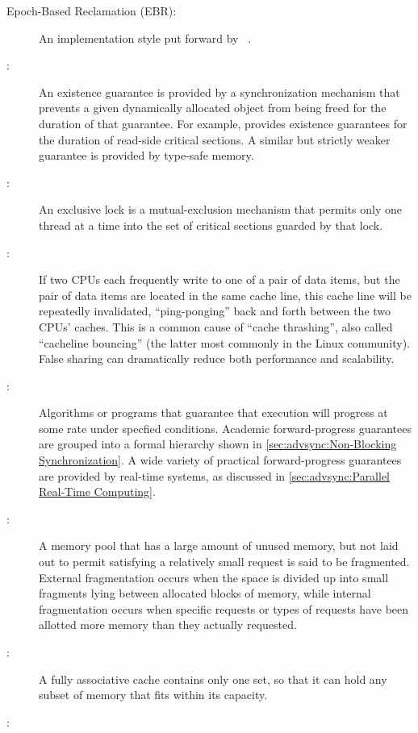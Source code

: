 \begin{description}
\item[Epoch-Based Reclamation (EBR):]
	An  implementation style put forward by
	~\cite{KeirAnthonyFraserPhD,UCAM-CL-TR-579,KeirFraser2007withoutLocks}.
\item[:]
	An existence guarantee is provided by a synchronization mechanism
	that prevents a given dynamically allocated object from being
	freed for the duration of that guarantee.
	For example,  provides existence guarantees for the duration
	of  read-side critical sections.
	A similar but strictly weaker guarantee is provided by
	type-safe memory.
\item[:]
	An exclusive lock is a mutual-exclusion mechanism that
	permits only one thread at a time into the
	set of critical sections guarded by that lock.
\item[:]
	If two CPUs each frequently write to one of a pair of data items,
	but the pair of data items are located in the same cache line,
	this cache line will be repeatedly invalidated, ``ping-ponging''
	back and forth between the two CPUs' caches.
	This is a common cause of ``cache thrashing'', also called
	``cacheline bouncing'' (the latter most commonly in the Linux
	community).
	False sharing can dramatically reduce both performance and
	scalability.
\item[:]
	Algorithms or programs that guarantee that execution will
	progress at some rate under specfied conditions.
	Academic forward-progress guarantees are grouped into a
	formal hierarchy shown in
	\cref{sec:advsync:Non-Blocking Synchronization}.
	A wide variety of practical forward-progress guarantees are
	provided by real-time systems, as discussed in
	\cref{sec:advsync:Parallel Real-Time Computing}.
\item[:]
	A memory pool that has a large amount of unused memory, but
	not laid out to permit satisfying a relatively small request
	is said to be fragmented.
	External fragmentation occurs when the space is divided up
	into small fragments lying between allocated blocks of memory,
	while internal fragmentation occurs when specific requests or
	types of requests have been allotted more memory than they
	actually requested.
\item[:]
	A fully associative cache contains only
	one set, so that it can hold any subset of
	memory that fits within its capacity.
\item[:]

\end{description}

